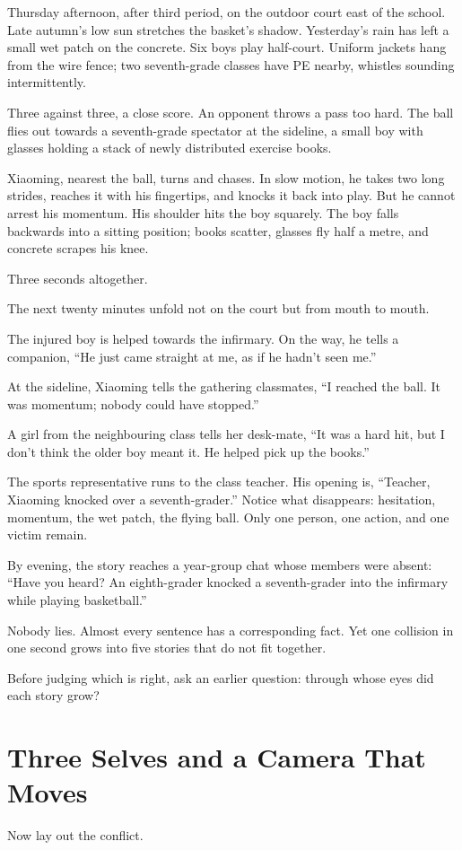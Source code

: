 Thursday afternoon, after third period, on the outdoor court east of the school. Late autumn's low sun stretches the basket's shadow. Yesterday's rain has left a small wet patch on the concrete. Six boys play half-court. Uniform jackets hang from the wire fence; two seventh-grade classes have PE nearby, whistles sounding intermittently.

Three against three, a close score. An opponent throws a pass too hard. The ball flies out towards a seventh-grade spectator at the sideline, a small boy with glasses holding a stack of newly distributed exercise books.

Xiaoming, nearest the ball, turns and chases. In slow motion, he takes two long strides, reaches it with his fingertips, and knocks it back into play. But he cannot arrest his momentum. His shoulder hits the boy squarely. The boy falls backwards into a sitting position; books scatter, glasses fly half a metre, and concrete scrapes his knee.

Three seconds altogether.

The next twenty minutes unfold not on the court but from mouth to mouth.

The injured boy is helped towards the infirmary. On the way, he tells a companion, ``He just came straight at me, as if he hadn't seen me.''

At the sideline, Xiaoming tells the gathering classmates, ``I reached the ball. It was momentum; nobody could have stopped.''

A girl from the neighbouring class tells her desk-mate, ``It was a hard hit, but I don't think the older boy meant it. He helped pick up the books.''

The sports representative runs to the class teacher. His opening is, ``Teacher, Xiaoming knocked over a seventh-grader.'' Notice what disappears: hesitation, momentum, the wet patch, the flying ball. Only one person, one action, and one victim remain.

By evening, the story reaches a year-group chat whose members were absent: ``Have you heard? An eighth-grader knocked a seventh-grader into the infirmary while playing basketball.''

Nobody lies. Almost every sentence has a corresponding fact. Yet one collision in one second grows into five stories that do not fit together.

Before judging which is right, ask an earlier question: through whose eyes did each story grow?

\section[Three Selves and a Moving Camera]{Three Selves and a Camera That Moves}
Now lay out the conflict.

